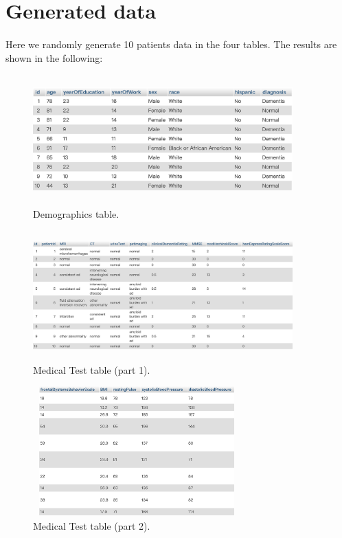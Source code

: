 \documentclass{article}
\begin{document}
\newpage
\section{Generated data}
\paragraph{}
Here we randomly generate 10 patients data in the four tables. The results are shown in the following:

\begin{figure}[!hbt]
\centering
\includegraphics[width=10cm, height=5cm]{figs/res_basics.png}
\caption{Demographics table.}
\label{f:res_basics}
\end{figure}

\begin{figure}[!hbt]
\centering
\includegraphics[width=10cm, height=5cm]{figs/res_medtest1.png}
\caption{Medical Test table (part 1).}
\label{f:res_medtest1}
\end{figure}

\begin{figure}[!hbt]
\centering
\includegraphics[width=8cm, height=5cm]{figs/res_medtest2.png}
\caption{Medical Test table (part 2).}
\label{f:res_medtest2}
\end{figure}
\end{document}
